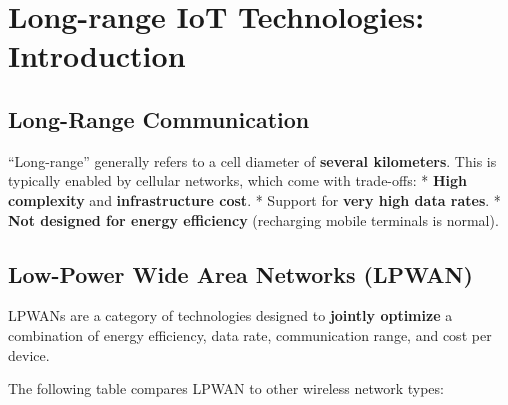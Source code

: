 \documentclass[a4paper, 12pt]{book} %
\begin{document}
\chapter{Long-range IoT Technologies:
Introduction}\label{long-range-iot-technologies-introduction}

\section{Long-Range Communication}\label{long-range-communication}

``Long-range'' generally refers to a cell diameter of \textbf{several
kilometers}. This is typically enabled by cellular networks, which come
with trade-offs: * \textbf{High complexity} and \textbf{infrastructure
cost}. * Support for \textbf{very high data rates}. * \textbf{Not
designed for energy efficiency} (recharging mobile terminals is normal).

\section{Low-Power Wide Area Networks
(LPWAN)}\label{low-power-wide-area-networks-lpwan}

LPWANs are a category of technologies designed to \textbf{jointly
optimize} a combination of energy efficiency, data rate, communication
range, and cost per device.

The following table compares LPWAN to other wireless network types:
\end{document}
